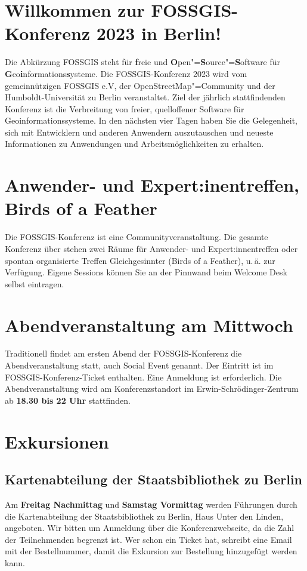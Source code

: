 \newpage
\section*{Willkommen zur FOSSGIS-Konferenz 2023 in Berlin!}\label{welcome}
Die Abkürzung { FOSSGIS} steht für {\bfseries f}reie und {\bfseries O}pen"={\bfseries S}ource"={\bfseries S}oftware für {\bfseries G}eo{\bfseries i}nformations{\bfseries s}ysteme.
Die FOSSGIS-Konferenz 2023 wird vom gemeinnützigen FOSSGIS e.V, der
OpenStreetMap"=Community und der Humboldt-Universität zu Berlin
veranstaltet.
Ziel der jährlich stattfindenden Konferenz ist die Verbreitung von freier,
quelloffener Software für Geoinformationssysteme. In den nächsten vier Tagen
haben Sie die Gelegenheit, sich mit Entwicklern und anderen Anwendern
auszutauschen und \mbox{neueste} Informationen zu Anwendungen und
Arbeitsmöglichkeiten zu erhalten.

\section*{Anwender- und Expert:inentreffen, Birds of a Feather}
Die FOSSGIS-Konferenz ist eine Communityveranstaltung.
Die gesamte Konferenz über stehen zwei Räume für Anwender- und Expert:innentreffen oder spontan organisierte
Treffen Gleichgesinnter (Birds of a Feather), u.\,ä.
zur Verfügung. Eigene Sessions können Sie an der Pinnwand beim
Welcome Desk selbst eintragen.

\section*{Abendveranstaltung am Mittwoch}\label{schwaetzli}
Traditionell findet am ersten Abend der FOSSGIS-Konferenz die
Abendveranstaltung statt, auch Social Event genannt. Der Eintritt
ist im FOSSGIS-Konferenz-Ticket enthalten. Eine Anmeldung ist erforderlich.
Die Abendveranstaltung wird am Konferenzstandort im Erwin-Schrödinger-Zentrum
ab {\bfseries 18.30 bis 22 Uhr} stattfinden.

\section*{Exkursionen}
\subsection*{Kartenabteilung der Staatsbibliothek zu Berlin}
Am {\bfseries Freitag Nachmittag} und {\bfseries Samstag Vormittag} werden Führungen durch die Kartenabteilung der Staatsbibliothek zu Berlin, Haus Unter den Linden, angeboten. Wir bitten um Anmeldung über die Konferenzwebseite, da die Zahl der Teilnehmenden begrenzt ist. Wer schon ein Ticket hat, schreibt eine Email mit der Bestellnummer, damit die Exkursion zur Bestellung hinzugefügt werden kann.
\pagebreak

